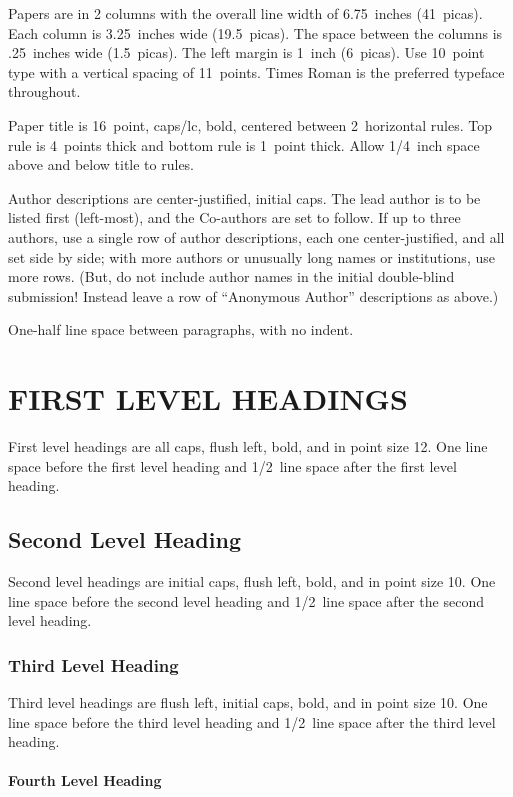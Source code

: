 \documentclass[twoside]{article}
\begin{document}
Papers are in 2 columns with the overall line width of 6.75~inches (41~picas). Each column is 3.25~inches wide (19.5~picas).  The space
between the columns is .25~inches wide (1.5~picas).  The left margin is 1~inch (6~picas).  Use 10~point type with a vertical spacing of
11~points. Times Roman is the preferred typeface throughout.

Paper title is 16~point, caps/lc, bold, centered between 2~horizontal rules.  Top rule is 4~points thick and bottom rule is 1~point thick.
Allow 1/4~inch space above and below title to rules.

Author descriptions are center-justified, initial caps.  The lead
author is to be listed first (left-most), and the Co-authors are set
to follow.  If up to three authors, use a single row of author
descriptions, each one center-justified, and all set side by side;
with more authors or unusually long names or institutions, use more
rows.  (But, do not include author names in the initial double-blind
submission!  Instead leave a row of ``Anonymous Author'' descriptions
as above.)


One-half line space between paragraphs, with no indent.

\section{FIRST LEVEL HEADINGS}

First level headings are all caps, flush left, bold, and in point size
12. One line space before the first level heading and 1/2~line space
after the first level heading.

\subsection{Second Level Heading}

Second level headings are initial caps, flush left, bold, and in point
size 10. One line space before the second level heading and 1/2~line
space after the second level heading.

\subsubsection{Third Level Heading}

Third level headings are flush left, initial caps, bold, and in point
size 10. One line space before the third level heading and 1/2~line
space after the third level heading.

\paragraph{Fourth Level Heading}
\end{document}
